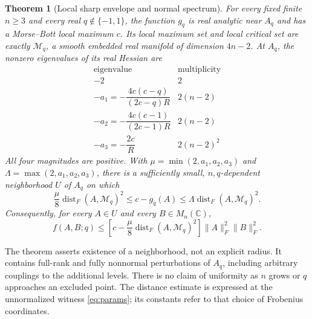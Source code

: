 \documentclass[11pt,a4paper]{article}
\newcommand{\dist}{\operatorname{dist}_F}
\newcommand{\norm}[1]{\lVert #1\rVert_F}
\newcommand{\Mq}{\mathcal M_q}
\newtheorem{theorem}{Theorem}
\begin{document}
\begin{theorem}[Local sharp envelope and normal spectrum]
\label{thm:local}
For every fixed finite \(n\geq3\) and every real
\(q\notin\{-1,1\}\), the function \(g_q\) is real analytic near
\(A_q\) and has a Morse--Bott local maximum \(c\).
Its local maximum set and local critical set are exactly \(\Mq\),
a smooth embedded real manifold of dimension \(4n-2\).
At \(A_q\), the nonzero eigenvalues of its real Hessian are
\begin{equation}
 \begin{array}{c|c}
 \text{eigenvalue}&\text{multiplicity}\\ \hline
 -2&2\\
 -a_1=-\dfrac{4c(c-q)}{(2c-q)R}&2(n-2)\\[2mm]
 -a_2=-\dfrac{4c(c-1)}{(2c-1)R}&2(n-2)\\[2mm]
 -a_3=-\dfrac{2c}{R}&2(n-2)^2
 \end{array}
 \label{eq:spectrum}
\end{equation}
All four magnitudes are positive. With
\(\mu=\min(2,a_1,a_2,a_3)\) and
\(\Lambda=\max(2,a_1,a_2,a_3)\), there is a sufficiently small,
\(n,q\)-dependent neighborhood \(U\) of \(A_q\) on which
\begin{equation}
 \frac{\mu}{8}\dist(A,\Mq)^2
 \leq c-g_q(A)\leq
 \Lambda\dist(A,\Mq)^2.
 \label{eq:deficit}
\end{equation}
Consequently, for every \(A\in U\) and every \(B\in M_n(\mathbb C)\),
\begin{equation}
 f(A,B;q)\leq
 \left[c-\frac{\mu}{8}\dist(A,\Mq)^2\right]
 \norm{A}^2\norm{B}^2.
 \label{eq:localf}
\end{equation}
\end{theorem}

The theorem asserts existence of a neighborhood, not an explicit
radius. It contains full-rank and fully nonnormal perturbations of
\(A_q\), including arbitrary couplings to the additional levels.
There is no claim of uniformity as \(n\) grows or \(q\) approaches
an excluded point. The distance estimate is expressed at the
unnormalized witness \eqref{eq:params}; its constants refer to that
choice of Frobenius coordinates.
\end{document}
